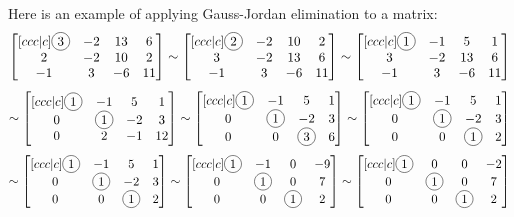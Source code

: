 \begin{applicationActivities}{3}{5}
\begin{observation}
  Here is an example of applying Gauss-Jordan elimination to a matrix:
  \[
    \begin{bmatrix}[ccc|c]
      \circledNumber{3} & -2 & 13 & 6 \\
      2 & -2 & 10 & 2 \\
      -1 & 3 & -6 & 11
    \end{bmatrix}\sim
    \begin{bmatrix}[ccc|c]
     \circledNumber{2} & -2 & 10 & 2 \\
      3 & -2 & 13 & 6 \\
      -1 & 3 & -6 & 11
    \end{bmatrix}\sim
    \begin{bmatrix}[ccc|c]
     \circledNumber{1} & -1 & 5 & 1 \\
      3 & -2 & 13 & 6 \\
      -1 & 3 & -6 & 11
    \end{bmatrix}
  \]
  \[\sim
    \begin{bmatrix}[ccc|c]
     \circledNumber{1} & -1 & 5 & 1 \\
      0 & \circledNumber{1} & -2 & 3 \\
      0 & 2 & -1 & 12
    \end{bmatrix}
    \sim
      \begin{bmatrix}[ccc|c]
       \circledNumber{1} & -1 & 5 & 1 \\
        0 & \circledNumber{1} & -2 & 3 \\
        0 & 0 & \circledNumber{3} & 6
      \end{bmatrix}
    \sim
    \begin{bmatrix}[ccc|c]
     \circledNumber{1} & -1 & 5 & 1 \\
      0 & \circledNumber{1} & -2 & 3 \\
      0 & 0 & \circledNumber{1} & 2
    \end{bmatrix}
  \]
  \[\sim
    \begin{bmatrix}[ccc|c]
     \circledNumber{1} & -1 & 5 & 1 \\
      0 & \circledNumber{1} & -2 & 3 \\
      0 & 0 & \circledNumber{1} & 2
    \end{bmatrix}
    \sim
    \begin{bmatrix}[ccc|c]
     \circledNumber{1} & -1 & 0 & -9 \\
      0 & \circledNumber{1} & 0 & 7 \\
      0 & 0 & \circledNumber{1} & 2
    \end{bmatrix}
    \sim
    \begin{bmatrix}[ccc|c]
     \circledNumber{1} & 0 & 0 & -2 \\
      0 & \circledNumber{1} & 0 & 7 \\
      0 & 0 & \circledNumber{1} & 2
    \end{bmatrix}
  \]
\end{observation}


\end{applicationActivities}
